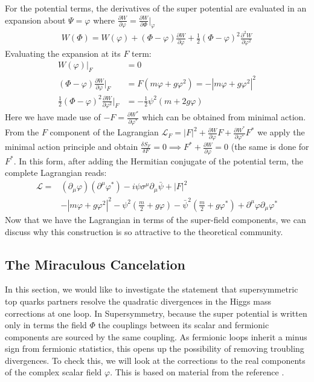 For the potential terms, the derivatives of the super potential are evaluated in an expansion about
 $\Psi = \varphi$ where $\frac{\partial W}{\partial \varphi}
  = \frac{\partial W}{\partial \Phi}|_{\varphi}$
\begin{align*}
W(\Phi) = W(\varphi) + (\Phi - \varphi) \frac{\partial W}{\partial \varphi} + \frac{1}{2}(\Phi - \varphi)^2
\frac{\partial^2 W}{\partial \varphi^2}
\end{align*}
Evaluating the expansion at its $F$ term:
\begin{align*}
W(\varphi)|_F &= 0 \\
(\Phi - \varphi) \frac{\partial W}{\partial \varphi}|_F &= F(m\varphi +g \varphi^2) = -|m\varphi+g\varphi^2|^2\\
\frac{1}{2}(\Phi - \varphi)^2 \frac{\partial W}{\partial\varphi^2}|_F &= -\frac{1}{2}\psi^2(m+2g\varphi)
\end{align*}
Here we have made use of $-F = \frac{\partial W^*}{\partial \varphi^*}$ which can be obtained from minimal action. From the $F$ component of the Lagrangian $\mathcal{L}_{F} = |F|^2 + \frac{\partial W}{\partial \varphi}F + \frac{\partial W^*}{\partial \varphi^*}F^*$ 
we apply the minimal action principle and obtain $\frac{\delta S_{F}}{\delta F}
 = 0 \implies F^* + \frac{\partial W}{\partial \varphi}=0$ (the same is done for $F^*$.  
In this form, after adding the Hermitian conjugate of the potential term, the complete Lagrangian reads:
\begin{align*}
\mathcal{L} =& (\partial_\mu \varphi)(\partial^\mu \varphi^*) -i\psi\sigma^\mu \partial_\mu \bar \psi + |F|^2\\
&- | m\varphi + g\varphi^2 |^2  
- \psi^2 ( \frac{m}{2} + g \varphi) - \bar{\psi}^2 ( \frac{m}{2} + g\varphi^* ) + \partial^\mu \varphi \partial_\mu \varphi^*
\end{align*}
Now that we have the Lagrangian in terms of the super-field components, we can discuss why this construction is so attractive to the theoretical community. 

\subsection{The Miraculous Cancelation}

In this section, we would like to investigate the statement that supersymmetric top quarks
partners resolve the quadratic divergences in the Higgs mass corrections at one loop. 
In Supersymmetry, because the super potential is written only in terms the field
$\Phi$ the couplings between its scalar and fermionic components
 are sourced by the same coupling. As fermionic loops inherit a minus sign from fermionic statistics, this opens up the possibility of removing troubling 
 divergences. To check this, we will look at the corrections to the real components of the complex scalar field $\varphi$. This is based on material from the reference \cite{susybook}.

